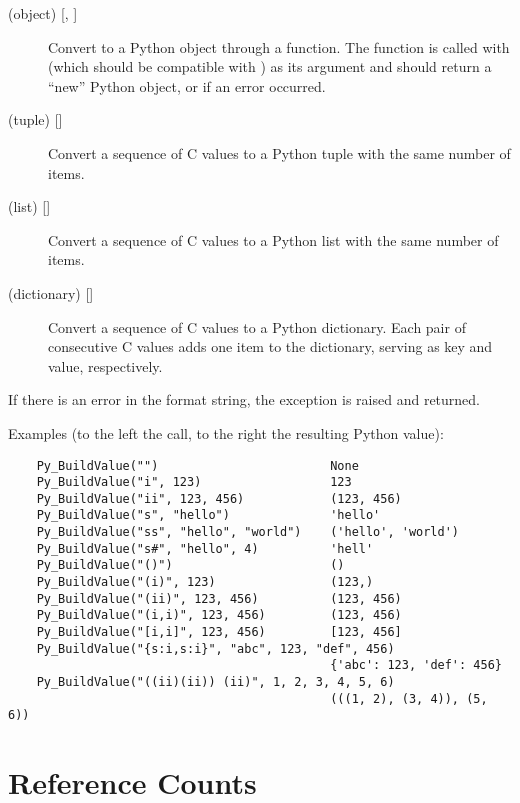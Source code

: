 \begin{description}
\item[ (object) {[, ]}]
Convert  to a Python object through a 
function.  The function is called with  (which should be
compatible with ) as its argument and should return a
``new'' Python object, or  if an error occurred.

\item[ (tuple) {[]}]
Convert a sequence of C values to a Python tuple with the same number
of items.

\item[ (list) {[]}]
Convert a sequence of C values to a Python list with the same number
of items.

\item[ (dictionary) {[]}]
Convert a sequence of C values to a Python dictionary.  Each pair of
consecutive C values adds one item to the dictionary, serving as key
and value, respectively.

\end{description}

If there is an error in the format string, the
 exception is raised and  returned.

Examples (to the left the call, to the right the resulting Python value):

\begin{verbatim}
    Py_BuildValue("")                        None
    Py_BuildValue("i", 123)                  123
    Py_BuildValue("ii", 123, 456)            (123, 456)
    Py_BuildValue("s", "hello")              'hello'
    Py_BuildValue("ss", "hello", "world")    ('hello', 'world')
    Py_BuildValue("s#", "hello", 4)          'hell'
    Py_BuildValue("()")                      ()
    Py_BuildValue("(i)", 123)                (123,)
    Py_BuildValue("(ii)", 123, 456)          (123, 456)
    Py_BuildValue("(i,i)", 123, 456)         (123, 456)
    Py_BuildValue("[i,i]", 123, 456)         [123, 456]
    Py_BuildValue("{s:i,s:i}", "abc", 123, "def", 456)
                                             {'abc': 123, 'def': 456}
    Py_BuildValue("((ii)(ii)) (ii)", 1, 2, 3, 4, 5, 6)
                                             (((1, 2), (3, 4)), (5, 6))
\end{verbatim}


\section{Reference Counts}

